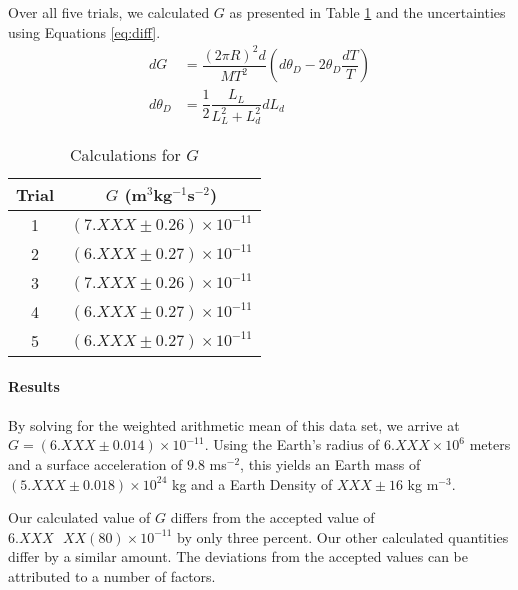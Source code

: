 Over all five trials, we calculated \(G\) as presented in Table \ref{eq:gcalc} and the uncertainties using Equations \eqref{eq:diff}. 
\begin{equation}\label{eq:diff}\begin{split}
	dG & = \dfrac{(2\pi R)^{2}d}{MT^{2}}\left(d\theta_{D} - 2\theta_{D} 	\dfrac{dT}{T} \right) \\
	d\theta_{D} & = \dfrac{1}{2} \dfrac{L_{L} }{L_{L}^{2} + L_{d}^{2}}dL_{d}
	\end{split}\end{equation}

\begin{table}[H]
	\centering
	\begin{tabular}{|c|c|}\hline
		Trial & \(G\) (m\(^{3}\)kg\(^{-1}\)s\(^{-2}\)) \\\hline
		1 & \((7.XXX\pm 0.26)\times 10^{-11}\) \\\hline
		2 & \((6.XXX\pm 0.27)\times 10^{-11}\) \\\hline
		3 & \((7.XXX\pm 0.26)\times 10^{-11}\) \\\hline
		4 & \((6.XXX\pm 0.27)\times 10^{-11}\) \\\hline
		5 & \((6.XXX\pm 0.27)\times 10^{-11}\) \\\hline
		\end{tabular}
	\caption{Calculations for \(G\)}\label{eq:gcalc}
	\end{table}

\paragraph{Results}

\paragraph{} By solving for the weighted arithmetic mean of this data set, we arrive at \(G = (6.XXX \pm0.014) \times 10^{-11} \). 
Using the Earth's radius of \(6.XXX\times 10^{6}\) meters and a surface acceleration of \(9.8\) ms\(^{-2}\), this yields an Earth mass of \((5.XXX \pm 0.018)\times 10^{24}\) kg and a Earth Density of \(XXX \pm 16 \) kg m\(^{-3}\). 

Our calculated value of \(G\) differs from the accepted value of \(6.XXX\text{ }XX(80)\times 10^{-11}\) \cite{pdg} by only three percent. 
Our other calculated quantities differ by a similar amount. The deviations from the accepted values can be attributed to a number of factors. 

